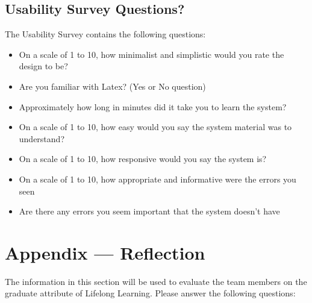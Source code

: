 \documentclass[12pt, titlepage]{article}
\begin{document}
	\subsection{Usability Survey Questions?}
	
	
	The Usability Survey contains the following questions:
	\begin{itemize}
		\item On a scale of 1 to 10, how minimalist and simplistic would you rate the design to be?
		\item Are you familiar with Latex? (Yes or No question)
		\item Approximately how long in minutes did it take you to learn the system?
		\item On a scale of 1 to 10, how easy would you say the system material was to understand?
		\item On a scale of 1 to 10, how responsive would you say the system is?
		\item On a scale of 1 to 10, how appropriate and informative were the errors you seen
		\item Are there any errors you seem important that the system doesn't have
	\end{itemize}
	
	
	
	\newpage{}
	\section*{Appendix --- Reflection}
	
	The information in this section will be used to evaluate the team members on the
	graduate attribute of Lifelong Learning.  Please answer the following questions:
	
\end{document}
